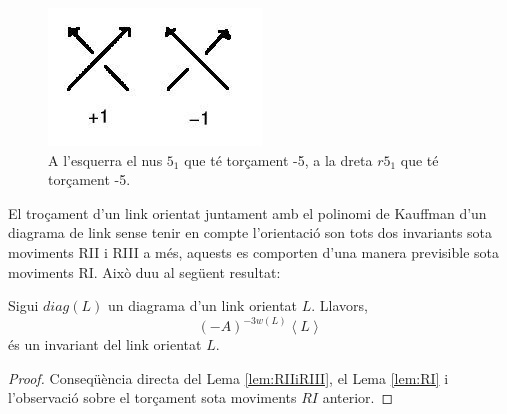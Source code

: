 \begin{figure}
	\centering
	\includegraphics[width=0.9\linewidth]{img/signe.jpg}
	\caption{A l'esquerra el nus $5_1$ que té torçament -5, a la dreta $r5_1$ que té torçament -5.}\label{fig:calculdelsigne}
\end{figure}

El troçament d'un link orientat juntament amb el polinomi de Kauffman d'un diagrama de link sense tenir en compte l'orientació son tots dos invariants sota moviments RII i RIII a més, aquests es comporten d'una manera previsible sota moviments RI. Això duu al següent resultat:

\begin{theorem}
	Sigui $diag(L)$ un diagrama d'un link orientat $L$. Llavors, $$(-A)^{-3w(L)}\left\langle L\right\rangle$$ és un invariant del link orientat $L$.
\end{theorem}

\begin{proof}
	Conseqüència directa del Lema \ref{lem:RIIiRIII}, el Lema \ref{lem:RI} i l'observació sobre el torçament sota moviments $RI$ anterior.
\end{proof}